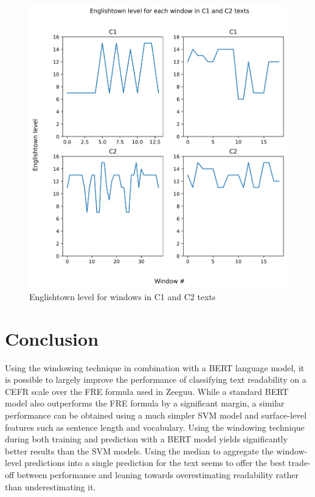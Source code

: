 \documentclass[11pt,a4paper]{article}
\begin{document}
\begin{figure}
  \centering
  \includegraphics[width=\textwidth]{figures/level-per-window.png}
  \caption{Englishtown level for windows in C1 and C2 texts}
  \label{fig:level-per-window}
\end{figure}

\section{Conclusion}

Using the windowing technique in combination with a BERT language model, it is
possible to largely improve the performance of classifying text readability
on a CEFR scale over the FRE formula used in Zeeguu. While a standard BERT
model also outperforms the FRE formula by a significant margin, a similar
performance can be obtained using a much simpler SVM model and surface-level
features such as sentence length and vocabulary. Using the windowing
technique during both training and prediction with a BERT model yields
significantly better results than the SVM models. Using the median to aggregate
the window-level predictions into a single prediction for the text seems to
offer the best trade-off between performance and leaning towards overestimating
readability rather than underestimating it.
\end{document}
